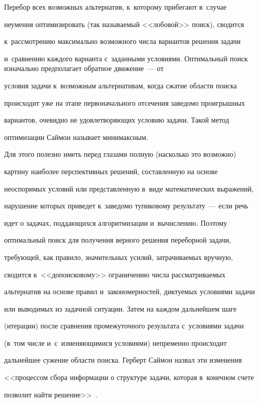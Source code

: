    


    Перебор всех возможных альтернатив, к~которому прибегают в~случае 


неумения оптимизировать (так называемый <<лобовой>> поиск), сводится 


к~рассмотрению максимально возможного числа вариантов решения задачи 


и~сравнению каждого варианта с~заданными условиями. Оптимальный поиск изначально предполагает обратное движение~--- от 


условия задачи к~возможным альтернативам, когда сжатие области поиска 


происходит уже на этапе первоначального отсечения заведомо проигрышных 


вариантов, очевидно не удовлетворяющих условию задачи. Такой метод 


оптимизации Саймон называет минимаксным. 




    Для этого полезно иметь перед глазами полную (насколько это возможно) 


картину наиболее перспективных решений, составленную на основе 


неоспоримых условий или представленную в~виде математических выражений, 


нарушение которых приведет к~заведомо тупиковому результату~--- если речь 


идет о задачах, поддающихся алгоритмизации и~вычислению. Поэтому 


оптимальный поиск для получения верного решения переборной задачи, 


требующей, как правило, значительных усилий, за\-тра\-чи\-ва\-емых вручную, 


сводится к~<<допоисковому>> ограничению числа рассматриваемых 


альтернатив на основе правил и~закономерностей, диктуемых условиями задачи 


или выводимых из задачной ситуации. Затем на каждом дальнейшем шаге 


(итерации) после сравнения промежуточного результата с~условиями задачи 


(в~том числе и~с~изменяющимися условиями) непременно происходит 


дальнейшее сужение области поиска. Герберт Саймон назвал эти изменения 


<<процессом сбора информации о структуре задачи, которая в~конечном счете 


позволит найти решение>>~\cite[с.~90]{7-kor}. 


